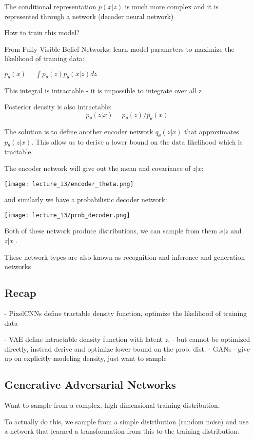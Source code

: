The conditional representation $p(x|z)$ is much more complex and it is represented through a network (decoder neural network)

How to train this model?

From Fully Visible Belief Networks: learn  model parameters to maximize the likelihood of training data:

$p_\theta(x) = \int p_\theta 	(z) p_\theta(x|z)dz$ 

This integral is intractable - it is impossible to integrate over all z

Posterior density is also intractable: $$p_\theta(z|x)=p_\theta(z)/p_\theta(x) $$

The solution is to define another encoder network $q_\theta(z|x)$ that approximates $p_\theta(z|x)$. This allow us to derive a lower bound on the data likelihood which is tractable. 

The encoder network will give out the mean and covariance of $z|x$:

\texttt{[image: lecture\_13/encoder\_theta.png]}

and similarly we have a probabilistic decoder network:

\texttt{[image: lecture\_13/prob\_decoder.png]}

Both of these network produce distributions, we can sample from them $x|z$ and $z|x$ .

These network types are also known as recognition and inference and generation networks

\subsection{Recap}

- PixelCNNs define tractable density function, optimize the likelihood of training data

- VAE define intractable density function with latent $z$, - but cannot be optimized directly, instead derive and optimize lower bound on the prob. dist.
- GANs - give up on explicitly modeling density, just want to sample

\subsection{Generative Adversarial Networks}

Want to sample from a complex, high dimensional training distribution.

To actually do this, we sample from a simple distribution (random noise) and use a network that learned a transformation from this to the training distribution.

